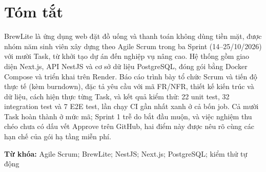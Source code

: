\chapter*{Tóm tắt}
BrewLite là ứng dụng web đặt đồ uống và thanh toán không dùng tiền mặt, được nhóm năm sinh viên xây dựng theo Agile Scrum trong ba Sprint (14--25/10/2026) với mười Task, từ khởi tạo dự án đến nghiệp vụ nâng cao. Hệ thống gồm giao diện Next.js, API NestJS và cơ sở dữ liệu PostgreSQL, đóng gói bằng Docker Compose và triển khai trên Render. Báo cáo trình bày tổ chức Scrum và tiến độ thực tế (kèm burndown), đặc tả yêu cầu với mã FR/NFR, thiết kế kiến trúc và dữ liệu, cách hiện thực từng Task, và kết quả kiểm thử: 22 unit test, 32 integration test và 7 E2E test, lần chạy CI gần nhất xanh ở cả bốn job. Cả mười Task hoàn thành ở mức mã; Sprint 1 trễ do bắt đầu muộn, và việc nghiệm thu chéo chưa có dấu vết Approve trên GitHub, hai điểm này được nêu rõ cùng các hạn chế của gói hạ tầng miễn phí.

\vspace{6pt}
\noindent\textbf{Từ khóa:} Agile Scrum; BrewLite; NestJS; Next.js; PostgreSQL; kiểm thử tự động

